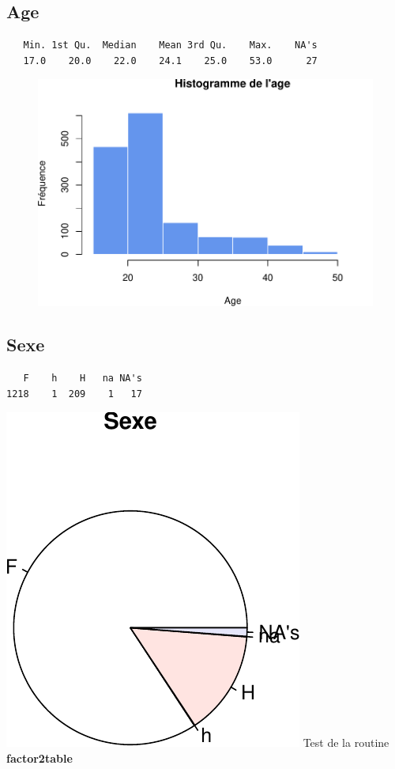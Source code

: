 \documentclass[]{article}
\begin{document}
\subsection{Age}\label{age}

\begin{verbatim}
   Min. 1st Qu.  Median    Mean 3rd Qu.    Max.    NA's 
   17.0    20.0    22.0    24.1    25.0    53.0      27 
\end{verbatim}

\begin{figure}[htbp]
\centering
\includegraphics{qs_etudiants_files/figure-latex/age-1.pdf}
\end{figure}

\subsection{Sexe}\label{sexe}

\begin{verbatim}
   F    h    H   na NA's 
1218    1  209    1   17 
\end{verbatim}

\includegraphics{qs_etudiants_files/figure-latex/sexe-1.pdf} Test de la
routine \textbf{factor2table}
\end{document}

